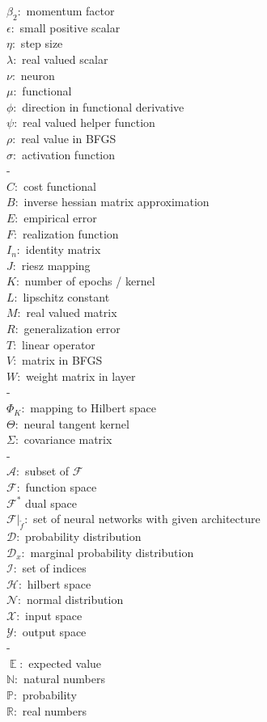 \documentclass[11pt, a4paper]{article}
\newcommand{\N}{\mathbb{N}}
\newcommand{\R}{\mathbb{R}}
\newcommand{\A}{\mathcal{A}}
\newcommand{\D}{\mathcal{D}}
\newcommand{\F}{\mathcal{F}}
\newcommand{\I}{\mathcal{I}}
\newcommand{\X}{\mathcal{X}}
\newcommand{\Y}{\mathcal{Y}}
\renewcommand{\H}{\mathcal{H}}
\DeclareMathOperator*{\E}{\mathbb{E}}
\begin{document}
$\beta_2:$ momentum factor \\
$\epsilon:$ small positive scalar \\
$\eta:$ step size \\
$\lambda:$ real valued scalar \\
$\nu:$ neuron \\
$\mu:$ functional \\
$\phi:$ direction in functional derivative \\
$\psi:$ real valued helper function \\
$\rho:$ real value in BFGS\\
$\sigma:$ activation function \\
- \\
$C:$ cost functional \\
$B:$ inverse hessian matrix approximation \\
$E:$ empirical error \\
$F:$ realization function \\
$I_n:$ identity matrix \\
$J:$ riesz mapping \\
$K:$ number of epochs / kernel \\
$L:$ lipschitz constant \\
$M:$ real valued matrix \\
$R:$ generalization error \\
$T:$ linear operator \\
$V:$ matrix in BFGS \\
$W:$ weight matrix in layer \\
- \\
$\Phi_K:$ mapping to Hilbert space \\ 
$\Theta:$ neural tangent kernel \\
$\Sigma:$ covariance matrix \\
- \\
$\A:$ subset of $\F$ \\
$\F:$ function space \\
$\F^*$ dual space \\
$\F |_{\tilde{f}}:$ set of neural networks with given architecture \\
$\D:$ probability distribution \\
$\D_x:$ marginal probability distribution \\
$\I:$ set of indices \\
$\H:$ hilbert space \\
$\mathcal{N}:$ normal distribution \\
$\X:$ input space \\
$\Y:$ output space \\
- \\
$\E:$ expected value \\
$\N:$ natural numbers \\
$\mathbb{P}:$ probability \\
$\R:$ real numbers \\
\end{document}
